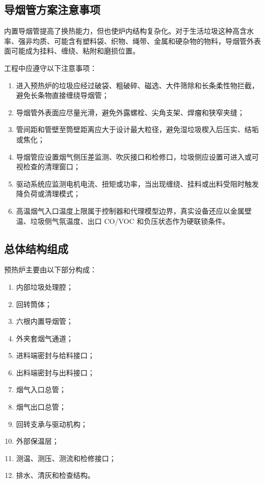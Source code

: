 \documentclass[UTF8,openany,zihao=-4,oneside]{ctexbook}
\providecommand{\tightlist}{\setlength{\itemsep}{0pt}\setlength{\parskip}{0pt}}
\begin{document}
\subsection{导烟管方案注意事项}\label{ux5bfcux70dfux7ba1ux65b9ux6848ux7684ux5de5ux7a0bux8fb9ux754c}

内置导烟管提高了换热能力，但也使炉内结构复杂化。对于生活垃圾这种高含水率、强非均质、可能含有塑料袋、织物、绳带、金属和硬杂物的物料，导烟管外表面可能成为挂料、缠绕、粘附和磨损位置。

工程中应遵守以下注意事项：

\begin{enumerate}
\def\labelenumi{\arabic{enumi}.}
\tightlist
\item
  进入预热炉的垃圾应经过破袋、粗破碎、磁选、大件筛除和长条柔性物拦截，避免长条物直接缠绕导烟管；
\item
  导烟管外表面应尽量光滑，避免外露螺栓、尖角支架、焊瘤和狭窄夹缝；
\item
  管间距和管壁至筒壁距离应大于设计最大粒径，避免湿垃圾楔入后压实、结垢或焦化；
\item
  导烟管应设置烟气侧压差监测、吹灰接口和检修口，垃圾侧应设置可进入或可视检查的清理窗口；
\item
  驱动系统应监测电机电流、扭矩或功率，当出现缠绕、挂料或出料受阻时触发降负荷或清理模式；
\item
  高温烟气入口温度上限属于控制器和代理模型边界，真实设备还应以金属壁温、垃圾侧气氛温度、出口 CO/VOC 和负压状态作为硬联锁条件。
\end{enumerate}

\subsection{总体结构组成}\label{ux603bux4f53ux7ed3ux6784ux7ec4ux6210}

预热炉主要由以下部分构成：

\begin{enumerate}
\def\labelenumi{\arabic{enumi}.}
\tightlist
\item
  内部垃圾处理腔；
\item
  回转筒体；
\item
  六根内置导烟管；
\item
  外夹套烟气通道；
\item
  进料端密封与给料接口；
\item
  出料端密封与出料接口；
\item
  烟气入口总管；
\item
  烟气出口总管；
\item
  回转支承与驱动机构；
\item
  外部保温层；
\item
  测温、测压、测流和检修接口；
\item
  排水、清灰和检查结构。
\end{enumerate}
\end{document}
